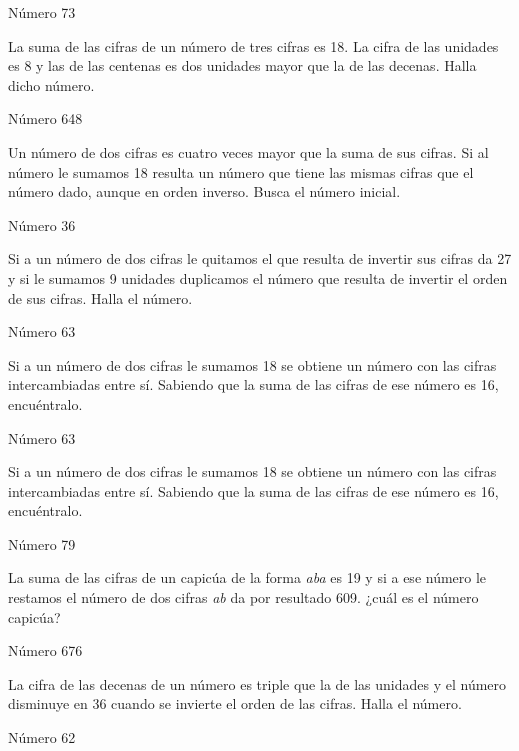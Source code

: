 \documentclass[spanish, 12pt]{exam}
\begin{document}
\begin{questions}
\begin{solution}  Número 73\end{solution}

\question La suma de las cifras de un número de tres cifras es 18. La cifra de las unidades es 8 y las de las centenas es dos unidades mayor que la de las decenas. Halla dicho número. 
\begin{solution} Número 648 \end{solution}

\question Un número de dos cifras es cuatro veces mayor que la suma de sus cifras. Si al número le sumamos 18 resulta un número que tiene las mismas cifras que el número dado, aunque en orden inverso. Busca el número inicial.
\begin{solution} Número 36 \end{solution}

\question Si a un número de dos cifras le quitamos el que resulta de invertir sus cifras da 27 y si le sumamos 9 unidades duplicamos el número que resulta de invertir el orden de sus cifras. Halla el número.
\begin{solution} Número 63 \end{solution}

\question Si a un número de dos cifras le sumamos 18 se obtiene un número con las cifras intercambiadas entre sí. Sabiendo que la suma de las cifras de ese número es 16, encuéntralo.
\begin{solution} Número 63 \end{solution}

\question Si a un número de dos cifras le sumamos 18 se obtiene un número con las cifras intercambiadas entre sí. Sabiendo que la suma de las cifras de ese número es 16, encuéntralo.
\begin{solution} Número 79 \end{solution}

\question La suma de las cifras de un capicúa de la forma \emph{aba} es 19 y si a ese número le restamos el número de dos cifras \emph{ab} da por resultado 609. ¿cuál es el número capicúa?
\begin{solution} Número 676 \end{solution}

\question La cifra de las decenas de un número es triple que la de las unidades y el número disminuye en 36 cuando se invierte el orden de las cifras. Halla el número.
\begin{solution} Número 62 \end{solution}


\end{questions}
\end{document}
